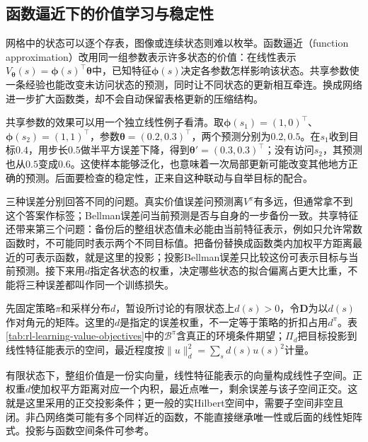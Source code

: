 \subsection{函数逼近下的价值学习与稳定性}
\label{sec:rl-learning-approximation}

网格中的状态可以逐个存表，图像或连续状态则难以枚举。函数逼近（function approximation）改用同一组参数表示许多状态的价值：在线性表示$V_{\bm{\theta}}(s)=\bm{\phi}(s)^\top\bm{\theta}$中，已知特征$\bm\phi(s)$决定各参数怎样影响该状态。共享参数使一条经验也能改变未访问状态的预测，同时让不同状态的更新相互牵连。换成网络进一步扩大函数类，却不会自动保留表格更新的压缩结构。

共享参数的效果可以用一个独立线性例子看清。取$\bm\phi(s_1)=(1,0)^\top$、$\bm\phi(s_2)=(1,1)^\top$，参数$\bm\theta=(0.2,0.3)^\top$，两个预测分别为$0.2,0.5$。在$s_1$收到目标$0.4$，用步长$0.5$做半平方误差下降，得到$\bm\theta'=(0.3,0.3)^\top$；没有访问$s_2$，其预测也从$0.5$变成$0.6$。这使样本能够泛化，也意味着一次局部更新可能改变其他地方正确的预测。后面要检查的稳定性，正来自这种联动与自举目标的配合。

三种误差分别回答不同的问题。真实价值误差问预测离$V^\pi$有多远，但通常拿不到这个答案作标签；Bellman误差问当前预测是否与自身的一步备份一致。共享特征还带来第三个问题：备份后的整组状态值未必能由当前特征表示，例如只允许常数函数时，不可能同时表示两个不同目标值。把备份替换成函数类内加权平方距离最近的可表示函数，就是这里的投影；投影Bellman误差只比较这份可表示目标与当前预测。接下来用$d$指定各状态的权重，决定哪些状态的拟合偏离占更大比重，不能将三种误差都叫作同一个训练损失。

先固定策略$\pi$和采样分布$d$，暂设所讨论的有限状态上$d(s)>0$，令$\bm D$为以$d(s)$作对角元的矩阵。这里的$d$是指定的误差权重，不一定等于策略的折扣占用$d^\pi$。表\ref{tab:rl-learning-value-objectives}中的$\mathcal B^\pi$含真正的环境条件期望；$\Pi_d$把目标投影到线性特征能表示的空间，最近程度按$\|u\|_d^2=\sum_s d(s)u(s)^2$计量。

有限状态下，整组价值是一份实向量，线性特征能表示的向量构成线性子空间。正权重$d$使加权平方距离对应一个内积，最近点唯一，剩余误差与该子空间正交。这就是这里采用的正交投影条件；更一般的实Hilbert空间中，需要子空间非空且闭。非凸网络类可能有多个同样近的函数，不能直接继承唯一性或后面的线性矩阵式。投影与函数空间条件可参考。

